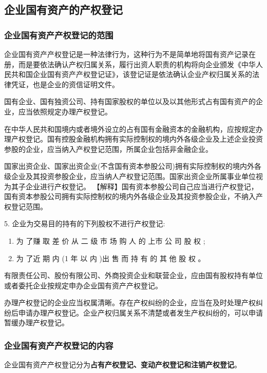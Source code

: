 \documentclass[UTF8,12pt]{ctexart}
\numberwithin{equation}{section} %
\numberwithin{figure}{section}
\numberwithin{table}{section}
\begin{document}
	
	\subsection{企业国有资产的产权登记}
	
	\subsubsection{企业国有资产产权登记的范围}
	
	企业国有资产产权登记是一种法律行为，这种行为不是简单地将国有资产记录在册，而是要依法确认产权归属关系，履行出资人职责的机构将向企业颁发《中华人民共和国企业国有资产产权登记证》，该登记证是依法确认企业产权归属关系的法律凭证，也是企业的资信证明文件。
	
	国有企业、国有独资公司、持有国家股权的单位以及以其他形式占有国有资产的企业，应当依照规定办理产权登记。
	
	在中华人民共和国境内或者境外设立的占有国有金融资本的金融机构，应按规定办理产权登记。国有控股金融机构拥有实际控制权的境内外各级企业及上述企业投资参股的企业，应当纳入产权登记范围，所属企业包括非金融企业。
	
	国家出资企业、国家出资企业(不含国有资本参股公司)拥有实际控制权的境内外各级企业及其投资参股企业，应当纳人产权登记范围。国家出资企业所属事业单位视为其子企业进行产权登记。
	【解释】国有资本参股公司自己应当进行产权登记，国有资本参股公司拥有实际控制权的境内外各级企业及其投资参股企业，不纳入产权登记范围。
	
	5. 企业为交易目的持有的下列股权不进行产权登记:
	\begin{enumerate}
		\item 为 了赚 取 差 价 从 二 级 市 场 购 人 的 上市 公 司 股 权 ;
		
		\item 为 了近 期 内 (1 年 以 内 )出 售 而 持 有 的 其 他 股 权 。
	\end{enumerate}
	
	有限责任公司、股份有限公司、外商投资企业和联营企业，应由国有股权持有单位或者委托企业按规定申办企业国有资产产权登记。
	
	办理产权登记的企业应当权属清晰。存在产权纠纷的企业，应当在及时处理产权纠纷后申请办理产权登记。企业产权归属关系不清楚或者发生产权纠纷的，可以申请暂缓办理产权登记。
	
	\subsubsection{企业国有资产产权登记的内容}
	
	企业国有资产产权登记分为\textbf{占有产权登记、变动产权登记和注销产权登记}。
	
\end{document}
